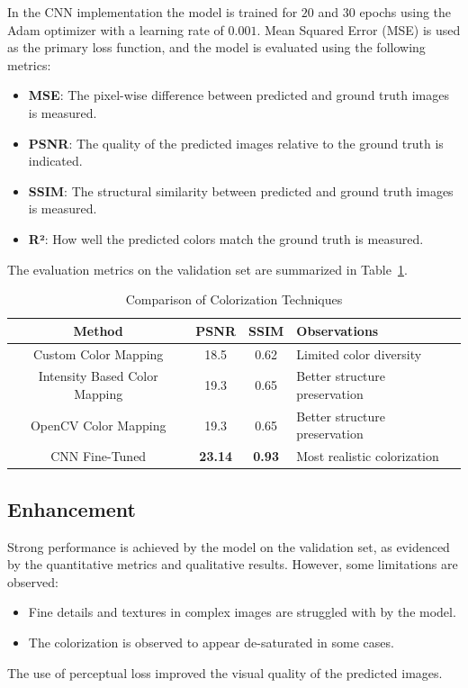 \documentclass[conference]{IEEEtran}
\begin{document}
\begin{itemize}
In the CNN implementation the model is trained for $20$ and $30$ epochs using the Adam optimizer with a learning rate of $0.001$. Mean Squared Error (MSE) is used as the primary loss function, and the model is evaluated using the following metrics:
\begin{itemize}
    \item \textbf{MSE}: The pixel-wise difference between predicted and ground truth images is measured.
    \item \textbf{PSNR}: The quality of the predicted images relative to the ground truth is indicated.
    \item \textbf{SSIM}: The structural similarity between predicted and ground truth images is measured.
    \item \textbf{R²}: How well the predicted colors match the ground truth is measured.
\end{itemize}
\end{itemize}
The evaluation metrics on the validation set are summarized in Table~\ref{table:metrics_results}.

\begin{table}[h]
\centering
\renewcommand{\arraystretch}{1.1} %
\setlength{\tabcolsep}{2pt} %
\begin{tabular}{|c|c|c|p{2.8cm}|}  %
\hline
\textbf{Method} & \textbf{PSNR} & \textbf{SSIM} & \textbf{Observations} \\ \hline
Custom Color Mapping & 18.5 & 0.62 & Limited color diversity \\ \hline
Intensity Based Color Mapping & 19.3 & 0.65 & Better structure preservation \\ \hline
OpenCV Color Mapping & 19.3 & 0.65 & Better structure preservation \\ \hline
CNN Fine-Tuned & \textbf{23.14} & \textbf{0.93} & Most realistic colorization \\ \hline
\end{tabular}
\caption{Comparison of Colorization Techniques}
\label{table:metrics_results}
\end{table}

\subsection{Enhancement}
Strong performance is achieved by the model on the validation set, as evidenced by the quantitative metrics and qualitative results. However, some limitations are observed:
\begin{itemize}
    \item Fine details and textures in complex images are struggled with by the model.
    \item The colorization is observed to appear de-saturated in some cases.
\end{itemize}
The use of perceptual loss improved the visual quality of the predicted images.
\end{document}
